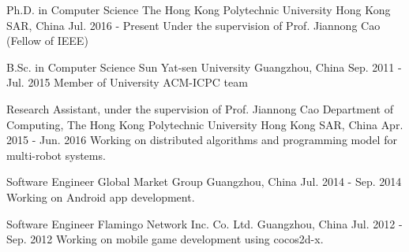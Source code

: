 \documentclass[11pt, a4paper]{awesome-cv} %
\begin{document}
\makecvheader %

\begin{cventries}
\cventry
{Ph.D. in Computer Science} %
{The Hong Kong Polytechnic University} %
{Hong Kong SAR, China} %
{Jul. 2016 - Present} %
{ %
Under the supervision of Prof. Jiannong Cao (Fellow of IEEE)
}

\cventry
{B.Sc. in Computer Science} %
{Sun Yat-sen University} %
{Guangzhou, China} %
{Sep. 2011 - Jul. 2015} %
{ %
Member of University ACM-ICPC team
}
\end{cventries}

\begin{cventries}
\cventry
{Research Assistant, under the supervision of Prof. Jiannong Cao} %
{Department of Computing, The Hong Kong Polytechnic University} %
{Hong Kong SAR, China} %
{Apr. 2015 - Jun. 2016} %
{ %
Working on distributed algorithms and programming model for multi-robot systems.
}

\cventry
{Software Engineer} %
{Global Market Group} %
{Guangzhou, China} %
{Jul. 2014 - Sep. 2014} %
{ %
Working on Android app development.
}

\cventry
{Software Engineer} %
{Flamingo Network Inc. Co. Ltd.} %
{Guangzhou, China} %
{Jul. 2012 - Sep. 2012} %
{ %
Working on mobile game development using cocos2d-x.
}
\end{cventries}
\end{document}
